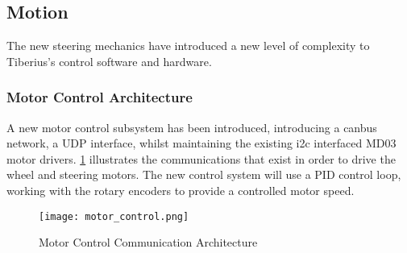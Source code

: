 \subsection{Motion}

The new steering mechanics have introduced a new level of complexity to Tiberius's control software and hardware.

\subsubsection{Motor Control Architecture}
A new motor control subsystem has been introduced, introducing a \gls{canbus} network, a \gls{UDP} interface, whilst maintaining the existing \gls{i2c} interfaced MD03 motor drivers. \ref{fig:motor-control-architecture} illustrates the communications that exist in order to drive the wheel and steering motors.
\newline
The new control system will use a PID control loop, working with the rotary encoders to provide a controlled motor speed.

\begin{figure}[!htb]
\begin{center}
\texttt{[image: motor\_control.png]}
\end{center}
\caption{Motor Control Communication Architecture}
\label{fig:motor-control-architecture}
\end{figure}